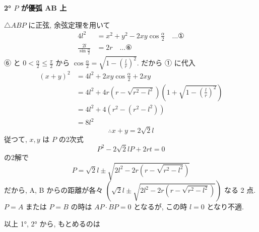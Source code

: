\documentclass[../main.tex]{subfiles}
\begin{document}
\bigskip

\noindent
\textbf{2° $P$ が優弧 AB 上}

\begin{center}
\end{center}

\noindent
$\triangle ABP$ に正弦, 余弦定理を用いて
\begin{align*}
  4l^2 &= x^2 + y^2 - 2xy \cos\frac{\alpha}{2} \quad \dots \text{①} \\
  \frac{2l}{\sin\frac{\alpha}{2}} &= 2r \quad \dots \text{⑥}
\end{align*}
⑥ と $0 < \frac{\alpha}{2} \le \frac{\pi}{2}$ から $\cos\frac{\alpha}{2} = \sqrt{1 - \left(\frac{l}{r}\right)^2}$. だから ① に代入
\begin{align*}
  (x+y)^2 &= 4l^2 + 2xy \cos\frac{\alpha}{2} + 2xy \\
  &= 4l^2 + 4r\left(r - \sqrt{r^2 - l^2}\right)\left(1 + \sqrt{1 - \left(\frac{l}{r}\right)^2}\right) \\
  &= 4l^2 + 4\left(r^2 - (r^2 - l^2)\right) \\
  &= 8l^2
\end{align*}
\[
  \therefore x + y = 2\sqrt{2}l
\]
従つて, $x, y$ は $P$ の2次式
\[
  P^2 - 2\sqrt{2}l P + 2rt = 0
\]
の2解で
\[
  P = \sqrt{2}l \pm \sqrt{2l^2 - 2r\left(r - \sqrt{r^2 - l^2}\right)}
\]
だから, A, B からの距離が各々 $\left( \sqrt{2}l \pm \sqrt{2l^2 - 2r\left(r - \sqrt{r^2 - l^2}\right)} \right)$ なる 2 点.
$P = A$ または $P = B$ の時は $AP \cdot BP = 0$ となるが, この時 $l = 0$ となり不適.

\bigskip

\noindent
以上 1°, 2° から, もとめるのは
\end{document}
